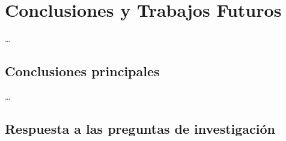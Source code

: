 \chapter{Conclusiones y Trabajos Futuros}
\label{ch:conclusiones}

\ldots

\section{Conclusiones principales}
\label{sec:conclusiones}

%
%
%
\ldots

\section{Respuesta a las preguntas de investigación}
\label{sec:respuesta_preguntas}

